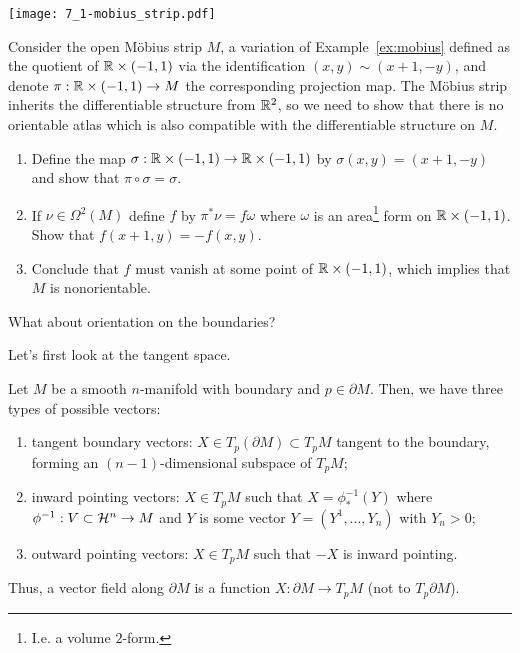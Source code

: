 \begin{marginfigure}
  \texttt{[image: 7\_1-mobius\_strip.pdf]}
\end{marginfigure}

\begin{exercise}
  Consider the open M\"obius strip $M$, a variation of Example~\ref{ex:mobius} defined as the quotient of $\mathbb{R}\times(-1,1)$ via the identification $(x,y) \sim (x+1, -y)$, and denote $\pi: \mathbb{R}\times(-1,1)\to M$ the corresponding projection map.
  The M\"obius strip inherits the differentiable structure from $\mathbb{R}^2$, so we need to show that there is no orientable atlas which is also compatible with the differentiable structure on $M$.
  \begin{enumerate}
    \item Define the map $\sigma:\mathbb{R}\times(-1,1)\to\mathbb{R}\times(-1,1)$ by $\sigma(x,y) = (x+1, -y)$ and show that $\pi\circ\sigma = \sigma$.
    \item If $\nu\in\Omega^2(M)$ define $f$ by $\pi^* \nu = f \omega$ where $\omega$ is an area\footnote{I.e. a volume $2$-form.} form on $\mathbb{R}\times(-1,1)$.
    Show that $f(x+1, y) = - f(x,y)$.
    \item Conclude that $f$ must vanish at some point of $\mathbb{R}\times(-1,1)$, which implies that $M$ is nonorientable.
  \end{enumerate}
\end{exercise}

What about orientation on the boundaries?

Let's first look at the tangent space. 

Let $M$ be a smooth $n$-manifold with boundary and $p\in \partial M$.
Then, we have three types of possible vectors:
\begin{enumerate}
  \item tangent boundary vectors: $X\in T_p(\partial M)\subset T_p M$ tangent to the boundary, forming an $(n-1)$-dimensional subspace of $T_p M$;
  \item inward pointing vectors: $X\in T_pM$ such that $X = \phi^{-1}_*(Y)$ where $\phi^{-1}: V\subset \mathcal{H}^n \to M$ and $Y$ is some vector $Y = (Y^1, \ldots, Y_n)$ with $Y_n > 0$;
  \item outward pointing vectors: $X\in T_pM$ such that $-X$ is inward pointing.
\end{enumerate}
Thus, a vector field along $\partial M$ is a function $X:\partial M\to T_pM$ (not to $T_p\partial M$).

